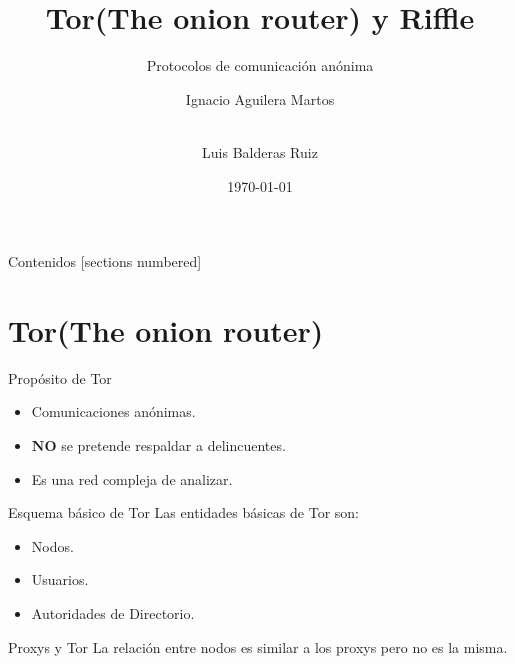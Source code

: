 \documentclass[10pt]{beamer}
\title{Tor(The onion router) y Riffle}
\subtitle{Protocolos de comunicación anónima}
\date{\today}
\author{Ignacio Aguilera Martos \and \\ Luis Balderas Ruiz}
\begin{document}
	

	
	
\frame{\titlepage}

	
\begin{frame}{Contenidos}
	[sections numbered]
	\tableofcontents[hideallsubsections]
\end{frame}

\section{Tor(The onion router)}

\begin{frame}[fragile]{Propósito de Tor}
	\begin{itemize}
		\item<1-> Comunicaciones anónimas.
		\item<2-> $\boldsymbol{NO}$ se pretende respaldar a delincuentes.
		\item<3-> Es una red compleja de analizar.
	\end{itemize}
\end{frame}

\begin{frame}[fragile]{Esquema básico de Tor}
	\pause
	Las entidades básicas de Tor son:\pause
	\begin{itemize}
		\item<1-> Nodos.\pause
		\item<2-> Usuarios.\pause
		\item<3-> Autoridades de Directorio.
	\end{itemize}
	\pause
	\begin{alertblock}{Proxys y Tor}
		La relación entre nodos es similar a los proxys pero no es la misma.
	\end{alertblock}
\end{frame}
\end{document}

